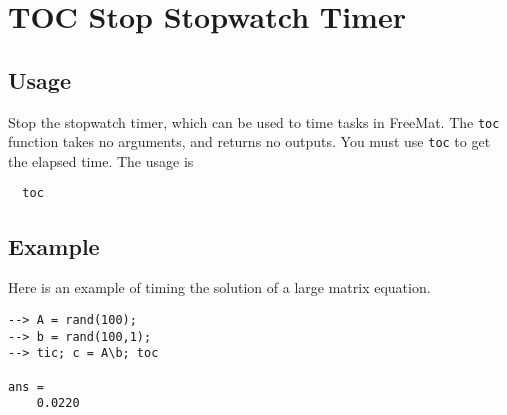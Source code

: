 \section{TOC Stop Stopwatch Timer}

\subsection{Usage}

Stop the stopwatch timer, which can be used to time tasks in FreeMat.
The \verb|toc| function takes no arguments, and returns no outputs.  You must use
\verb|toc| to get the elapsed time.  The usage is
\begin{verbatim}
  toc
\end{verbatim}
\subsection{Example}

Here is an example of timing the solution of a large matrix equation.
\begin{verbatim}
--> A = rand(100);
--> b = rand(100,1);
--> tic; c = A\b; toc

ans = 
    0.0220 
\end{verbatim}
